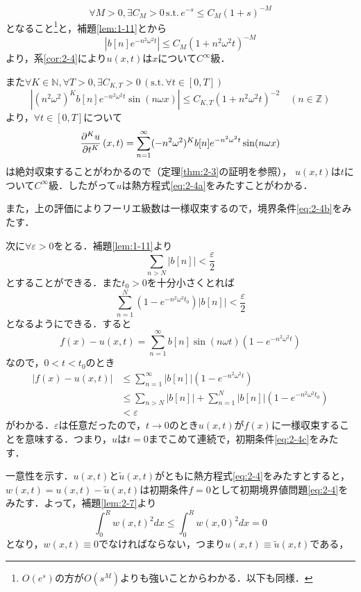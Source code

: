 \documentclass[dvipdfmx,a4j,10pt]{jsarticle}
\makeatletter
\theoremstyle{mystyle1}
\theoremstyle{mystyle3}
\theoremstyle{mystyle4}
\theoremstyle{mystyle6}
\theoremstyle{mystyle2}
\theoremstyle{mystyle5}
\renewenvironment{proof}[1][\proofname]{\par
  \pushQED{\qed}%
  \normalfont
  \topsep6\p@\@plus6\p@ \trivlist
  \item[\hskip\labelsep{\bfseries\sffamily #1}]\ignorespaces
}{%
  \popQED\endtrivlist\@endpefalse
}
\renewcommand\proofname{証明}
\makeatother
\begin{document}
\begin{proof}
	\[
		\forall M>0,\exists C_M>0\,\textrm{s.t.}\, e^{-s}\leq C_M(1+s)^{-M}
	\]
	となること\footnote{$O(e^s)$の方が$O(s^M)$よりも強いことからわかる．以下も同様．}と，補題\ref{lem:1-11}とから
	\begin{equation}\label{eq:2-7}
		|b[n]e^{-n^2\omega^2 t}|\leq C_M(1+n^2\omega^2 t)^{-M}
	\end{equation}
	より，系\ref{cor:2-4}により$u(x,t)$は$x$について$C^\infty$級．

	また$\forall K\in\mathbb{N},\forall T>0,\exists C_{K,T}>0\,(\textrm{s.t.}\, \forall t\in[0,T])$
	\[
		|(n^2 \omega^2)^K b[n]e^{-n^2\omega^2 t}\sin(n\omega x)|\leq C_{K,T}(1+n^2\omega^2 t)^{-2}\quad(n\in\mathbb{Z})
	\]
	より，$\forall t\in[0,T]$について
	\[
		\pdv[K]{u}{t}\,(x,t)=\sum_{n=1}^\infty (-n^2\omega^2)^K b[n]e^{-n^2\omega^2 t}\sin(n\omega x)
	\]
	は絶対収束することがわかるので（定理\ref{thm:2-3}の証明を参照），
	$u(x,t)$は$t$について$C^\infty$級．したがって$u$は熱方程式\eqref{eq:2-4a}をみたすことがわかる．

	また，上の評価によりフーリエ級数は一様収束するので，境界条件\eqref{eq:2-4b}をみたす．

	次に$\forall\varepsilon>0$をとる．補題\ref{lem:1-11}より
	\[
		\sum_{n>N}|b[n]|<\frac{\varepsilon}{2}
	\]
	とすることができる．また$t_0>0$を十分小さくとれば
	\[
		\sum_{n=1}^N(1-e^{-n^2\omega^2t_0})|b[n]|<\frac{\varepsilon}{2}
	\]
	となるようにできる．すると
	\[
		f(x)-u(x,t)=\sum_{n=1}^\infty b[n]\sin(n\omega t)(1-e^{-n^2\omega^2t})
	\]
	なので，$0<t<t_0$のとき
	\[
		\begin{split}
			|f(x)-u(x,t)|&\leq\sum_{n=1}^\infty |b[n]|(1-e^{-n^2\omega^2t}) \\
			&\leq \sum_{n>N}|b[n]|+\sum_{n=1}^N|b[n]|(1-e^{-n^2\omega^2t_0}) \\
			&<\varepsilon
		\end{split}
	\]
	がわかる．$\varepsilon$は任意だったので，$t\to 0$のとき$u(x,t)$が$f(x)$に一様収束することを意味する．つまり，$u$は$t=0$までこめて連続で，初期条件\eqref{eq:2-4c}をみたす．

	一意性を示す．$u(x,t)$と$\tilde u(x,t)$がともに熱方程式\eqref{eq:2-4}をみたすとすると，$w(x,t)=u(x,t)-\tilde u(x,t)$は初期条件$f=0$として初期境界値問題\eqref{eq:2-4}をみたす．よって，補題\ref{lem:2-7}より
	\[
		\int_0^R w(x,t)^2dx\leq \int_0^R w(x,0)^2dx=0
	\]
	となり，$w(x,t)\equiv 0$でなければならない，つまり$u(x,t)\equiv \tilde u(x,t)$である，
\end{proof}
\end{document}
